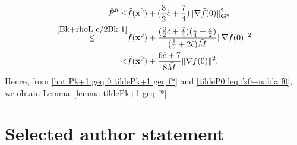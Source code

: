 \documentclass[10pt,a4paper]{amsart}
\begin{document}
\begin{align}
	\tilde{P}^0\leq& \tilde{f}(\mathbf{x}^0)+ (\frac{3}{2}\tilde{c}+\frac{7}{4})\|\nabla \tilde{f}(0)\|^2_{\mathbf{G}^0}\notag\\
	\overset{\eqref{Bk+rhoL-c/2Bk-1}}{\leq} &\tilde{f}(\mathbf{x}^0) +\frac{(\frac{3}{2}\tilde{c}+\frac{7}{4})(\frac{1}{4}+\frac{\tilde{c}}{2})}{(\frac{1}{2}+2\tilde{c})\bar{M}}\|\nabla \tilde{f}(0)\|^2 \notag\\
	< & \tilde{f}(\mathbf{x}^0) +\frac{6\tilde{c}+7}{8\bar{M}}\|\nabla \tilde{f}(0)\|^2. \label{tildeP0 leq fx0+nabla f0}
\end{align}
Hence, from \eqref{hat Pk+1 geq 0 tildePk+1 geq f*} and \eqref{tildeP0 leq fx0+nabla f0}, we obtain Lemma~\ref{lemma tildePk+1 geq f*}.


\section*{Selected author statement}
\end{document}

